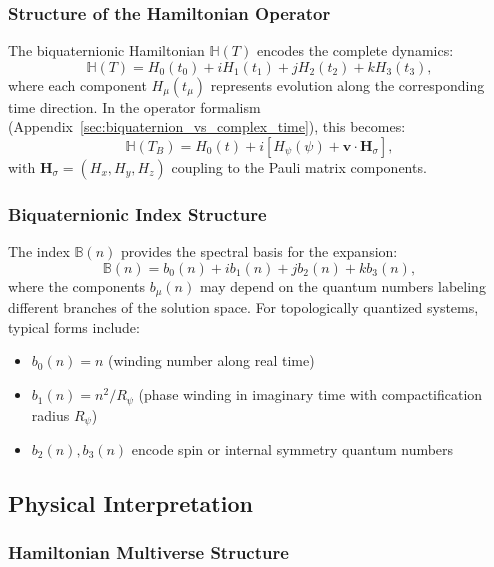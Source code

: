 \subsubsection{Structure of the Hamiltonian Operator}

The biquaternionic Hamiltonian $\mathbb{H}(T)$ encodes the complete dynamics:
\begin{equation}
\mathbb{H}(T) = H_0(t_0) + i H_1(t_1) + j H_2(t_2) + k H_3(t_3),
\label{eq:hamiltonian_structure}
\end{equation}
where each component $H_\mu(t_\mu)$ represents evolution along the corresponding time direction. In the operator formalism (Appendix~\ref{sec:biquaternion_vs_complex_time}), this becomes:
\begin{equation}
\mathbb{H}(T_B) = H_0(t) + i\left[H_\psi(\psi) + \mathbf{v} \cdot \mathbf{H}_\sigma\right],
\label{eq:hamiltonian_operator_form}
\end{equation}
with $\mathbf{H}_\sigma = (H_x, H_y, H_z)$ coupling to the Pauli matrix components.

\subsubsection{Biquaternionic Index Structure}

The index $\mathbb{B}(n)$ provides the spectral basis for the expansion:
\begin{equation}
\mathbb{B}(n) = b_0(n) + i b_1(n) + j b_2(n) + k b_3(n),
\label{eq:biquat_index}
\end{equation}
where the components $b_\mu(n)$ may depend on the quantum numbers labeling different branches of the solution space. For topologically quantized systems, typical forms include:
\begin{itemize}
\item $b_0(n) = n$ (winding number along real time)
\item $b_1(n) = n^2/R_\psi$ (phase winding in imaginary time with compactification radius $R_\psi$)
\item $b_2(n), b_3(n)$ encode spin or internal symmetry quantum numbers
\end{itemize}

\subsection{Physical Interpretation}

\subsubsection{Hamiltonian Multiverse Structure}

